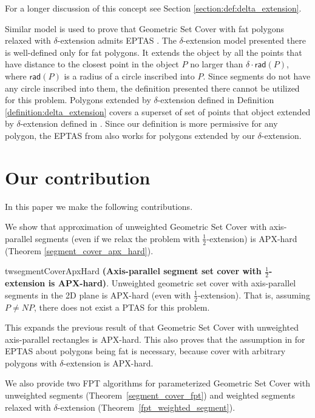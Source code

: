 For a longer discussion of this concept see Section
\ref{section:def:delta_extension}.

Similar model is used to prove that Geometric Set Cover with fat polygons
relaxed with $\delta$-extension admits EPTAS \cite{harpeled12}.
The $\delta$-extension model presented there is well-defined only
for fat polygons. It extends the object by all the points that
have distance to the closest point in the object $P$
no larger than $\delta\cdot \mathsf{rad}(P)$, where $\mathsf{rad}(P)$
is a radius of a circle inscribed into $P$.
Since segments do not have any circle inscribed into them,
the definition presented there cannot be utilized for this problem.
Polygons extended by $\delta$-extension
defined in Definition \ref{definition:delta_extension}
covers a superset of set of points that object extended
by $\delta$-extension defined in \cite{harpeled12}.
Since our definition is more permissive for any polygon,
the EPTAS from \cite{harpeled12}
also works for polygons extended by our $\delta$-extension.

\section*{Our contribution}
In this paper we make the following contributions.

We show that approximation of unweighted Geometric Set Cover with axis-parallel segments
(even if we relax the problem with  $\frac{1}{2}$-extension) is APX-hard
(Theorem \ref{segment_cover_apx_hard}).

\begin{restatable}{tw}{segmentCoverApxHard}{
\label{segment_cover_apx_hard}
	\textbf{(Axis-parallel segment set cover with $\frac{1}{2}$-extension is APX-hard)}.	
	Unweighted geometric set cover
	with axis-parallel segments in the 2D plane
	is APX-hard (even with $\frac{1}{2}$-extension).
	That is, assuming $P\neq NP$, there does not exist a PTAS
	for this problem.
}\end{restatable}

This expands the previous result of \cite{rectangles_apx_hard} 
that Geometric Set Cover
with unweighted axis-parallel rectangles is APX-hard.
This also proves that the assumption in \cite{harpeled12}
for EPTAS about polygons being fat is necessary, because
cover with arbitrary polygons with $\delta$-extension is APX-hard.

We also provide two FPT algorithms for parameterized Geometric Set Cover 	
with unweighted segments (Theorem~\ref{segment_cover_fpt})
and weighted segments relaxed with $\delta$-extension
(Theorem~\ref{fpt_weighted_segment}).

